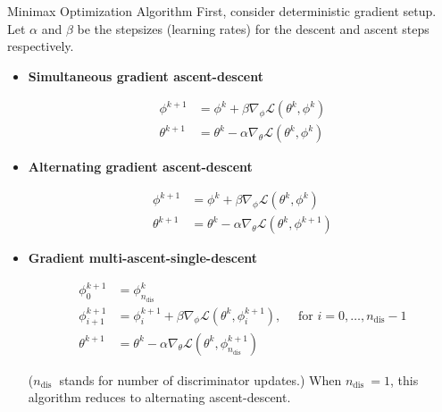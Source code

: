 \begin{frame}[allowframebreaks]

\begin{mydefinitionblock}{12.4}{Minimax Optimization Algorithm}
    First, consider deterministic gradient setup. Let $\alpha$ and $\beta$ be the stepsizes (learning rates) for the descent and ascent steps respectively.

    \begin{itemize}
        \item
        \textbf{Simultaneous gradient ascent-descent}

        $$
        \begin{aligned}
        \phi^{k+1} & =\phi^{k}+\beta \nabla_{\phi} \mathcal{L}\left(\theta^{k}, \phi^{k}\right) \\
        \theta^{k+1} & =\theta^{k}-\alpha \nabla_{\theta} \mathcal{L}\left(\theta^{k}, \phi^{k}\right)
        \end{aligned}
        $$
        \item
        \textbf{Alternating gradient ascent-descent}

        $$
        \begin{aligned}
        \phi^{k+1} & =\phi^{k}+\beta \nabla_{\phi} \mathcal{L}\left(\theta^{k}, \phi^{k}\right) \\
        \theta^{k+1} & =\theta^{k}-\alpha \nabla_{\theta} \mathcal{L}\left(\theta^{k}, \phi^{k+1}\right)
        \end{aligned}
        $$
        \item
        \textbf{Gradient multi-ascent-single-descent}

        $$
        \begin{aligned}
        \phi_{0}^{k+1} & =\phi_{n_{\mathrm{dis}}}^{k} \\
        \phi_{i+1}^{k+1} & =\phi_{i}^{k+1}+\beta \nabla_{\phi} \mathcal{L}\left(\theta^{k}, \phi_{i}^{k+1}\right), \quad \text { for } i=0, \ldots, n_{\mathrm{dis}}-1 \\
        \theta^{k+1} & =\theta^{k}-\alpha \nabla_{\theta} \mathcal{L}\left(\theta^{k}, \phi_{n_{\mathrm{dis}}}^{k+1}\right)
        \end{aligned}
        $$

        ($n_{\text {dis }}$ stands for number of discriminator updates.)
        When $n_{\text {dis }}=1$, this algorithm reduces to alternating ascent-descent.
    \end{itemize}
\end{mydefinitionblock}

\end{frame}

